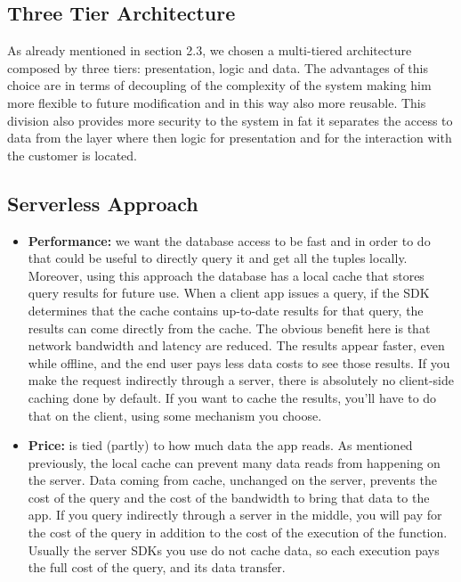 \documentclass[../RASD.tex]{subfiles}
\begin{document}
    \subsection{Three Tier Architecture}\label{subsec:three-tier-architecture}
    As already mentioned in section 2.3, we chosen a multi-tiered architecture composed by three tiers: presentation, logic and data.
    The advantages of this choice are in terms of decoupling of the complexity of the system making him more flexible to future modification
    and in this way also more reusable.
    This division also provides more security to the system in fat it separates the access to data from the layer where then logic for presentation
    and for the interaction with the customer is located.
    \subsection{Serverless Approach}\label{subsec:serverless-approach}
    \begin{itemize}
        \item \textbf{Performance:} we want the database access to be fast and in order to do that could be useful to directly query it and get all the tuples locally.
        Moreover, using this approach the database has a local cache that stores query results for future use.
        When a client app issues a query, if the SDK determines that the cache contains up-to-date results for that query, the results can come directly from the cache.
        The obvious benefit here is that network bandwidth and latency are reduced.
        The results appear faster, even while offline, and the end user pays less data costs to see those results.
        If you make the request indirectly through a server, there is absolutely no client-side caching done by default.
        If you want to cache the results, you’ll have to do that on the client, using some mechanism you choose.
        \item \textbf{Price:} is tied (partly) to how much data the app reads.
        As mentioned previously, the local cache can prevent many data reads from happening on the server.
        Data coming from cache, unchanged on the server, prevents the cost of the query and the cost of the bandwidth to bring that data to the app.
        If you query indirectly through a server in the middle, you will pay for the cost of the query in addition to the cost of the execution of the function.
        Usually the server SDKs you use do not cache data, so each execution pays the full cost of the query, and its data transfer.
    \end{itemize}
\end{document}
